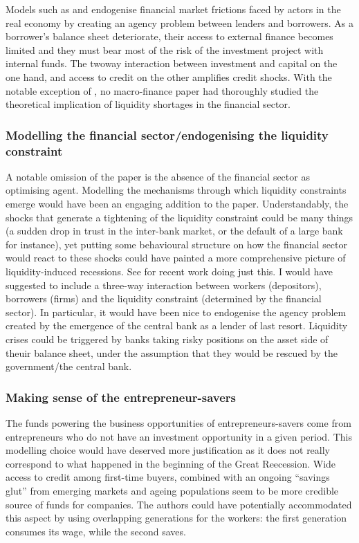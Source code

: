 \documentclass{amsart}
\theoremstyle{definition}
\theoremstyle{remark}
\numberwithin{equation}{section}
\begin{document}
Models such as \cite{bernanke1989agency} and \cite{kiyotaki1997credit} endogenise financial market frictions faced by actors in the real economy by creating an agency problem between lenders and borrowers. As a borrower's balance sheet deteriorate, their access to external finance becomes limited and they must bear most of the risk of the investment project with internal funds. The twoway interaction between investment and capital on the one hand, and access to credit on the other amplifies credit shocks. With the notable exception of \cite{holmstrom1997financial}, no macro-finance paper had thoroughly studied the theoretical implication of liquidity shortages in the financial sector. \\

\subsubsection*{Modelling the financial sector/endogenising the liquidity constraint} A notable omission of the paper is the absence of the financial sector as optimising agent. Modelling the mechanisms through which liquidity constraints emerge would have been an engaging addition to the paper. Understandably, the shocks that generate a tightening of the liquidity constraint could be many things (a sudden drop in trust in the inter-bank market, or the default of a large bank for instance), yet putting some behavioural structure on how the financial sector would react to these shocks could have painted a more comprehensive picture of liquidity-induced recessions. See \cite{he2013intermediary, angeloni2013capital, gertler2010financial} for recent work doing just this. I would have suggested to include a three-way interaction between workers (depositors), borrowers (firms) and the liquidity constraint (determined by the financial sector). In particular, it would have been nice to endogenise the agency problem created by the emergence of the central bank as a lender of last resort. Liquidity crises could be triggered by banks taking risky positions on the asset side of theuir balance sheet, under the assumption that they would be rescued by the government/the central bank.\\     

\subsubsection{Making sense of the entrepreneur-savers} The funds powering the business opportunities of entrepreneurs-savers come from entrepreneurs who do not have an investment opportunity in a given period. This modelling choice would have deserved more justification as it does not really correspond to what happened in the beginning of the Great Reecession. Wide access to credit among first-time buyers, combined with an ongoing ``savings glut'' from emerging markets and ageing populations seem to be more credible source of funds for companies. The authors could have potentially accommodated this aspect by using overlapping generations for the workers: the first generation consumes its wage, while the second saves.\\ 
\end{document}
